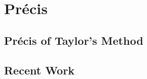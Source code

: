 % 

\section{Pr\'ecis}

\subsection{Pr\'ecis of Taylor's Method}

\subsection{Recent Work}

\endinput  %

